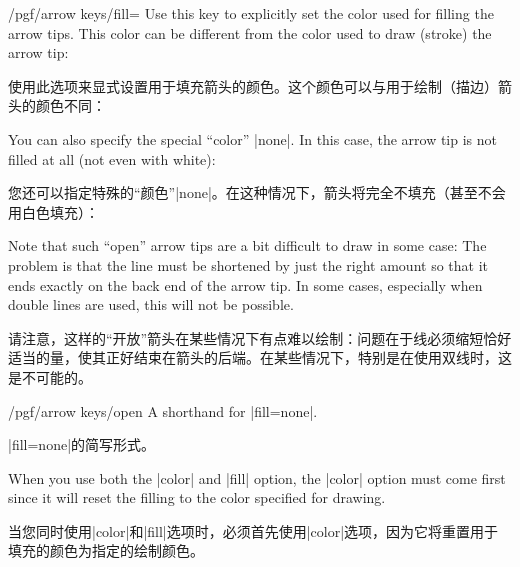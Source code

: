 \begin{key}{/pgf/arrow keys/fill=}
    Use this key to explicitly set the color used for filling the arrow tips.
    This color can be different from the color used to draw (stroke) the arrow
    tip:
    
    使用此选项来显式设置用于填充箭头的颜色。这个颜色可以与用于绘制（描边）箭头的颜色不同：
\begin{codeexample}[width=3cm,preamble={\usetikzlibrary{arrows.meta}}]
\end{codeexample}
    You can also specify the special ``color'' |none|. In this case, the arrow
    tip is not filled at all (not even with white):
    
    您还可以指定特殊的“颜色”|none|。在这种情况下，箭头将完全不填充（甚至不会用白色填充）：
\begin{codeexample}[width=3cm,preamble={\usetikzlibrary{arrows.meta}}]
\end{codeexample}
    Note that such ``open'' arrow tips are a bit difficult to draw in some
    case: The problem is that the line must be shortened by just the right
    amount so that it ends exactly on the back end of the arrow tip. In some
    cases, especially when double lines are used, this will not be possible.

    请注意，这样的“开放”箭头在某些情况下有点难以绘制：问题在于线必须缩短恰好适当的量，使其正好结束在箭头的后端。在某些情况下，特别是在使用双线时，这是不可能的。

\begin{key}{/pgf/arrow keys/open}
        A shorthand for |fill=none|.

        |fill=none|的简写形式。
    \end{key}

    When you use both the |color| and |fill| option, the |color| option must
    come first since it will reset the filling to the color specified for
    drawing.
    
    当您同时使用|color|和|fill|选项时，必须首先使用|color|选项，因为它将重置用于填充的颜色为指定的绘制颜色。
\begin{codeexample}[width=3cm,preamble={\usetikzlibrary{arrows.meta}}]
\end{codeexample}


\end{key}
